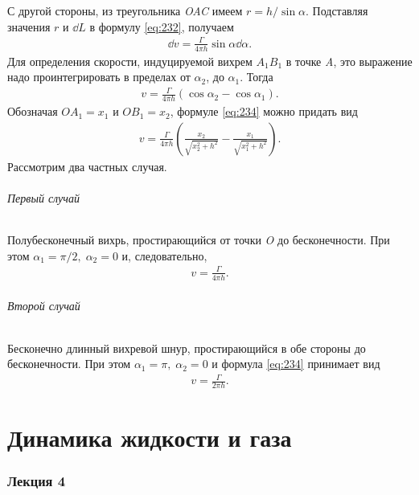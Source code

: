 	С другой стороны, из треугольника \textit{OAC} имеем $r = h/\sin\alpha$.\n
	Подставляя значения $r$ и $\dd L$ в формулу \eqref{eq:232}, получаем
	\begin{gather*}
		\dd v = \frac{\Gamma}{4\pi h}\sin\alpha\dd\alpha.
	\end{gather*}\n
	Для определения скорости, индуцируемой вихрем $A_1 B_1$ в точке \textit{A}, это выражение надо проинтегрировать в пределах от $\alpha_2$, до $\alpha_1$. Тогда
	\begin{gather}
		v = \frac{\Gamma}{4\pi h}\left(\cos\alpha_2 - \cos\alpha_1\right).\label{eq:234}
	\end{gather}\n
	Обозначая $OA_1 = x_1$ и $OB_1 = x_2$, формуле \eqref{eq:234} можно придать вид
	\begin{gather}
		v = \frac{\Gamma}{4\pi h}\left(\frac{x_2}{\sqrt{x_2^2+h^2}} - \frac{x_1}{\sqrt{x_1^2+h^2}}\right).\label{eq:235}
	\end{gather}\n
	Рассмотрим два частных случая.
	\paragraph{Первый случай} Полубесконечный вихрь, простирающийся от точки \textit{O} до бесконечности. При этом $\alpha_1 = \pi/2,\; \alpha_2 = 0$ и, следовательно,
	\begin{gather}
		v = \frac{\Gamma}{4\pi h}.\label{eq:236}
	\end{gather}
	\paragraph{Второй случай} Бесконечно длинный вихревой шнур, простирающийся в обе стороны до бесконечности. При этом $\alpha_1 = \pi,\; \alpha_2 = 0$ и формула \eqref{eq:234} принимает вид
	\begin{gather}
		v = \frac{\Gamma}{2\pi h}.\label{eq:237}
	\end{gather}
	
	\newpage
	\part{Динамика жидкости и газа}
	
	\section{Лекция 4}
	

